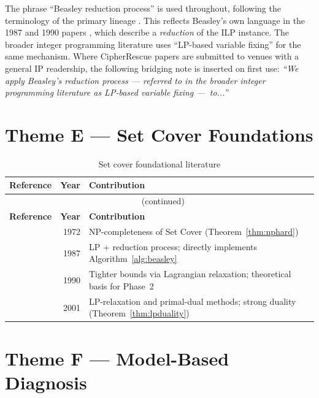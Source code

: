 \documentclass[11pt,a4paper]{report}
\begin{document}
\begin{tcolorbox}[enhanced, colback=lightamber!40, colframe=amber, arc=4pt, fonttitle=\bfseries,
  title={Terminological Note for CipherRescue Papers}]
The phrase ``Beasley reduction process'' is used throughout, following the terminology of the primary lineage \citep{babatunde2025thesis,babatunde2026arxiv}. This reflects Beasley's own language in the 1987 and 1990 papers \citep{beasley1987,beasley1990}, which describe a \emph{reduction} of the ILP instance. The broader integer programming literature uses ``LP-based variable fixing'' for the same mechanism. Where CipherRescue papers are submitted to venues with a general IP readership, the following bridging note is inserted on first use: \emph{``We apply Beasley's reduction process \citep{beasley1987} --- referred to in the broader integer programming literature as LP-based variable fixing ---~to...''}
\end{tcolorbox}

\section{Theme E --- Set Cover Foundations}

\begin{longtable}{@{}p{5.5cm}rp{7cm}@{}}
\caption{Set cover foundational literature}\label{tab:themeE}\\
\toprule \textbf{Reference} & \textbf{Year} & \textbf{Contribution} \\ \midrule
\endfirsthead
\multicolumn{3}{c}{\tablename\ \thetable{} (continued)}\\ \toprule \textbf{Reference} & \textbf{Year} & \textbf{Contribution} \\ \midrule
\endhead
\citet{karp1972} & 1972 & NP-completeness of Set Cover (Theorem~\ref{thm:nphard}) \\
\citet{beasley1987} & 1987 & LP + reduction process; directly implements Algorithm~\ref{alg:beasley} \\
\citet{beasley1990} & 1990 & Tighter bounds via Lagrangian relaxation; theoretical basis for Phase~2 \\
\citet{vazirani2001} & 2001 & LP-relaxation and primal-dual methods; strong duality (Theorem~\ref{thm:lpduality}) \\
\bottomrule
\end{longtable}

\section{Theme F --- Model-Based Diagnosis}
\end{document}
